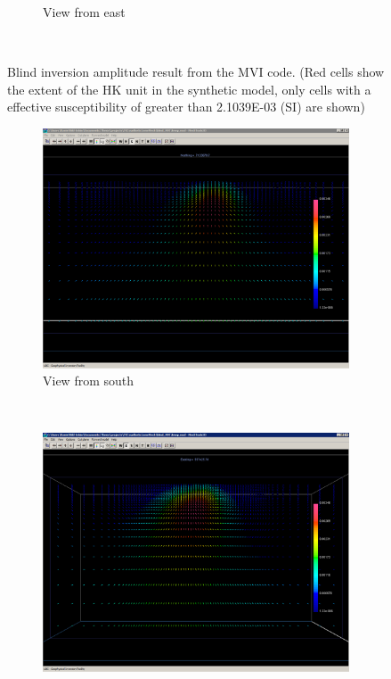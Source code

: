 \begin{figure}
\begin{subfigure}[b]{0.5\textwidth}
        \caption{View from east}
        \label{fig:blindMVIeast}
    \end{subfigure}
    ~ %
   \caption{Blind inversion amplitude result from the \ac{MVI} code. (Red cells show the extent of the HK unit in the synthetic model, only cells with a effective susceptibility of greater than 2.1039E-03 (SI) are shown)}
   \label{fig:blindMVI}
\end{figure}

\begin{figure}
    \centering
    \begin{subfigure}[b]{0.5\textwidth}
        \includegraphics[width=\textwidth]{images/TKC/blindMVIsouthFld.PNG}
        \caption{View from south}
        \label{fig:blindMVIsouthFld}
    \end{subfigure}
    ~ %
    \begin{subfigure}[b]{0.5\textwidth}
        \includegraphics[width=\textwidth]{images/TKC/blindMVIeastFld.PNG}

\end{subfigure}
\end{figure}
